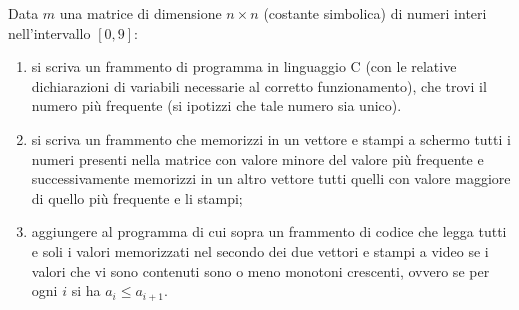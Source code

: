 \begin{Exercise}[label={ex:istogramma_matrice}]
  	Data $m$ una matrice di dimensione $n \times n$ (costante simbolica) di numeri interi nell'intervallo $[0,9]$:
  	\begin{enumerate}
  			\item si scriva un frammento di programma in linguaggio C (con le relative dichiarazioni di variabili necessarie al corretto funzionamento), che trovi il numero pi\`u frequente (si ipotizzi che tale numero sia unico).
				\item si scriva un frammento che memorizzi in un vettore e stampi a schermo tutti i numeri presenti nella matrice con valore minore del valore pi\`u frequente e successivamente memorizzi in un altro vettore tutti quelli con valore maggiore di quello più frequente e li stampi;
  			\item aggiungere al programma di cui sopra un frammento di codice che legga tutti e soli i valori memorizzati nel secondo dei due vettori e stampi a video se i valori che vi sono contenuti sono o meno monotoni crescenti, ovvero se per ogni $i$ si ha $a_i \leq a_{i+1}$.
  	\end{enumerate}
\end{Exercise}

\begin{Answer}[ref={ex:istogramma_matrice}]
  	
\end{Answer}